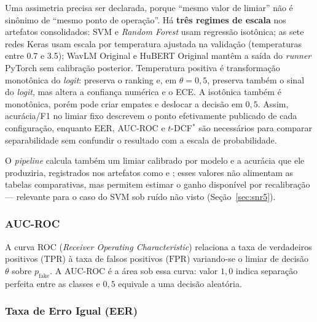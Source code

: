 \documentclass[12pt,a4paper]{article}
\begin{document}
Uma assimetria precisa ser declarada, porque ``mesmo valor de limiar'' não é
sinônimo de ``mesmo ponto de operação''. Há \textbf{três regimes de escala} nos
artefatos consolidados: SVM e \textit{Random Forest} usam regressão isotônica;
as sete redes Keras usam escala por temperatura ajustada na validação
(temperaturas entre \num{0,7} e \num{3,5}); WavLM Original e HuBERT Original
mantêm a saída do \textit{runner} PyTorch sem calibração posterior. Temperatura
positiva é transformação monotônica do \textit{logit}: preserva o ranking e,
em $\theta=0{,}5$, preserva também o sinal do \textit{logit}, mas altera a
confiança numérica e o ECE. A isotônica também é monotônica, porém pode criar
empates e deslocar a decisão em $0{,}5$. Assim, acurácia/F1 no limiar fixo
descrevem o ponto efetivamente publicado de cada configuração, enquanto EER,
AUC-ROC e $t$-DCF$^\ast$ são necessários para comparar separabilidade sem
confundir o resultado com a escala de probabilidade.

O \textit{pipeline} calcula também um limiar calibrado por modelo e a acurácia
que ele produziria, registrados nos artefatos como
 e ;
esses valores não alimentam as tabelas comparativas, mas permitem estimar o
ganho disponível por recalibração --- relevante para o caso do SVM sob ruído
não visto (Seção~\ref{sec:snr5}).

\subsubsection*{AUC-ROC}

A curva ROC (\textit{Receiver Operating Characteristic}) relaciona a taxa de
verdadeiros positivos ($\mathrm{TPR}$) à taxa de falsos positivos ($\mathrm{FPR}$) variando-se o
limiar de decisão $\theta$ sobre $p_{\mathrm{fake}}$. A AUC-ROC é a área sob essa curva:
valor $1{,}0$ indica separação perfeita entre as classes e $0{,}5$ equivale a
uma decisão aleatória.

\subsubsection*{Taxa de Erro Igual (EER)}
\end{document}
